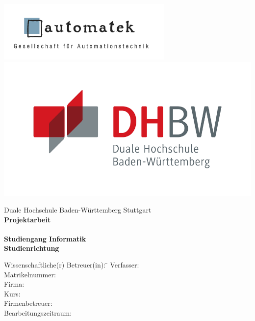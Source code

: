 \begin{titlepage}
\begin{minipage}{\textwidth}
		\vspace{-1cm}
		\includegraphics[scale=0.6]{imagedir/firmenlogo} \hfill \includegraphics[scale=0.13]{imagedir/logo}
\end{minipage}
\vspace{10em}
\begin{center}
	{\textsf{\large Duale Hochschule Baden-W\"urttemberg Stuttgart}}\\[4em]
	{\textsf{\textbf{\large{\DieArtDerArbeit} Projektarbeit}}}\\[6mm]
	{\textsf{\textbf{\Large{}\DerTitelDerArbeit}}} \\[1.5cm]
	{\textsf{\textbf{\large{}Studiengang Informatik}}\\[6mm]
	\textsf{\textbf{Studienrichtung \DieStudienrichtung}}}\vspace{18em}
	
	\begin{minipage}{\textwidth}
		\begin{tabbing}
		Wissenschaftliche(r) Betreuer(in): \hspace{0.85cm}\=\kill
		Verfasser: \> \DerAutorDerArbeit \\[1.5mm]
		Matrikelnummer: \> \DieMatrikelnummer \\[1.5mm]
		Firma: \> \DerNameDerFirma  \\[1.5mm]
		Kurs: \> \DieKursbezeichnung \\[1.5mm]
		Firmenbetreuer: \> \DerFirmenBetreuer \\[1.5mm]
		Bearbeitungszeitraum: \> \DerBearbeitungszeitraum\\[1.5mm]
		\end{tabbing}
	\end{minipage}
\end{center}
\end{titlepage}